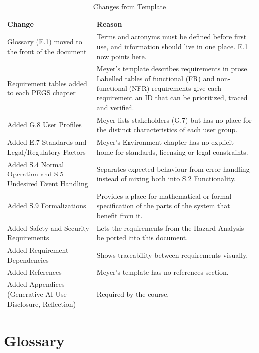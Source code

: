 \documentclass[12pt]{article}
\newcommand{\tocsection}[1]{%
  \phantomsection
  \section*{#1}
  \addcontentsline{toc}{section}{#1}%
}
\begin{document}
\begin{table}[H]
\caption{Changes from Template} \label{ChangesFromTemplate}
\begin{tabularx}{\textwidth}{|p{4.5cm}|>{\raggedright\arraybackslash}X|}
\hline
\textbf{Change} & \textbf{Reason} \\
\hline
Glossary (E.1) moved to the front of the document & Terms and acronyms must be defined before first use, and information should live in one place. E.1 now points here. \\
\hline
Requirement tables added to each PEGS chapter & Meyer's template describes requirements in prose. Labelled tables of functional (FR) and non-functional (NFR) requirements give each requirement an ID that can be prioritized, traced and verified. \\
\hline
Added G.8 User Profiles & Meyer lists stakeholders (G.7) but has no place for the distinct characteristics of each user group. \\
\hline
Added E.7 Standards and Legal/Regulatory Factors & Meyer's Environment chapter has no explicit home for standards, licensing or legal constraints. \\
\hline
Added S.4 Normal Operation and S.5 Undesired Event Handling & Separates expected behaviour from error handling instead of mixing both into S.2 Functionality. \\
\hline
Added S.9 Formalizations & Provides a place for mathematical or formal specification of the parts of the system that benefit from it. \\
\hline
Added Safety and Security Requirements & Lets the requirements from the Hazard Analysis be ported into this document. \\
\hline
Added Requirement Dependencies & Shows traceability between requirements visually. \\
\hline
Added References & Meyer's template has no references section. \\
\hline
Added Appendices (Generative AI Use Disclosure, Reflection) & Required by the course. \\
\hline
\end{tabularx}
\end{table}

\tocsection{Glossary}
\label{sec:glossary}

\end{document}

